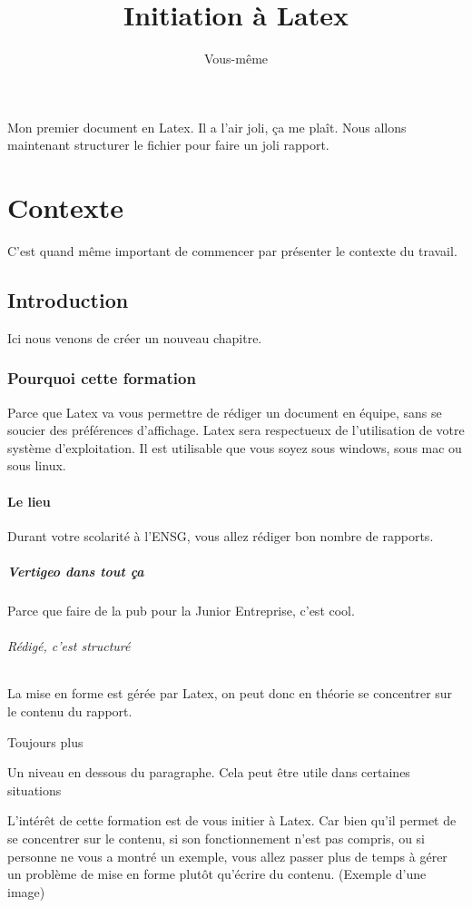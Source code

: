 \documentclass[10pt,a4paper]{report} %
\title{Initiation à Latex}
\author{Vous-même}
\begin{document}
\maketitle
\tableofcontents
\listoffigures
\listoftables
\listofalgorithms

\newpage
Mon premier document en Latex. Il a l'air joli, ça me plaît.
Nous allons maintenant structurer le fichier pour faire un joli rapport.

\part{Contexte}
C'est quand même important de commencer par présenter le contexte du travail.
\chapter{Introduction}
Ici nous venons de créer un nouveau chapitre.
\section{Pourquoi cette formation}
Parce que Latex va vous permettre de rédiger un document en équipe, sans se soucier des préférences d'affichage. Latex sera respectueux de l'utilisation de votre système d'exploitation. Il est utilisable que vous soyez sous windows, sous mac ou sous linux.
\subsection{Le lieu}
Durant votre scolarité à l'ENSG, vous allez rédiger bon nombre de rapports. 
\subsubsection{Vertigeo dans tout ça}
Parce que faire de la pub pour la Junior Entreprise, c'est cool.
\paragraph{Rédigé, c'est structuré}
La mise en forme est gérée par Latex, on peut donc en théorie se concentrer sur le contenu du rapport.
\subparagraph{Toujours plus}
Un niveau en dessous du paragraphe. Cela peut être utile dans certaines situations

L'intérêt de cette formation est de vous initier à Latex. Car bien qu'il permet de se concentrer sur le contenu, si son fonctionnement n'est pas compris, ou si personne ne vous a montré un exemple, vous allez passer plus de temps à gérer un problème de mise en forme plutôt qu'écrire du contenu. (Exemple d'une image)
\end{document}
